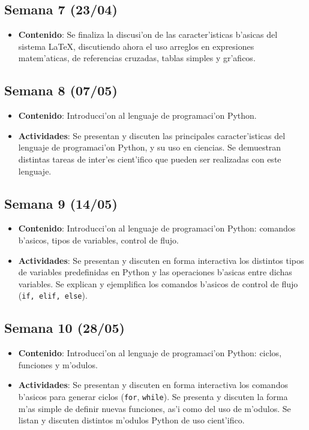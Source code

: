 \documentclass[letterpaper,11pt]{exam}
\begin{document}
\begin{multicols}{2}
\begin{scriptsize}
\subsection*{Semana 7 (23/04)}
\begin{itemize}
\item \textbf{Contenido}: Se finaliza la discusi'on de las caracter'isticas b'asicas del sistema \LaTeX, discutiendo ahora el uso arreglos en expresiones matem'aticas, de referencias cruzadas, tablas simples y gr'aficos.
\end{itemize}

\subsection*{Semana 8 (07/05)}
\begin{itemize}
\item \textbf{Contenido}: Introducci'on al lenguaje de programaci'on Python.
\item \textbf{Actividades}: Se presentan y discuten las principales caracter'isticas del lenguaje de programaci'on Python, y su uso en ciencias. Se demuestran distintas tareas de inter'es cient'ifico que pueden ser realizadas con este lenguaje.
\end{itemize}

\subsection*{Semana 9 (14/05)}
\begin{itemize}
\item \textbf{Contenido}: Introducci'on al lenguaje de programaci'on Python: comandos b'asicos, tipos de variables, control de flujo.
\item \textbf{Actividades}: Se presentan y discuten en forma interactiva los distintos tipos de variables predefinidas en Python y las operaciones b'asicas entre dichas variables. Se explican y ejemplifica los comandos b'asicos de control de flujo (\texttt{if, elif, else}).
\end{itemize}


\subsection*{Semana 10 (28/05)}
\begin{itemize}
\item \textbf{Contenido}: Introducci'on al lenguaje de programaci'on Python: ciclos, funciones y m'odulos.
\item \textbf{Actividades}: Se presentan y discuten en forma interactiva los comandos b'asicos para generar ciclos (\texttt{for}, \texttt{while}). Se presenta y discuten la forma m'as simple de definir nuevas funciones, as'i como del uso de m'odulos. Se listan y discuten distintos m'odulos Python de uso cient'ifico.
\end{itemize}


\end{scriptsize}
\end{multicols}
\end{document}
